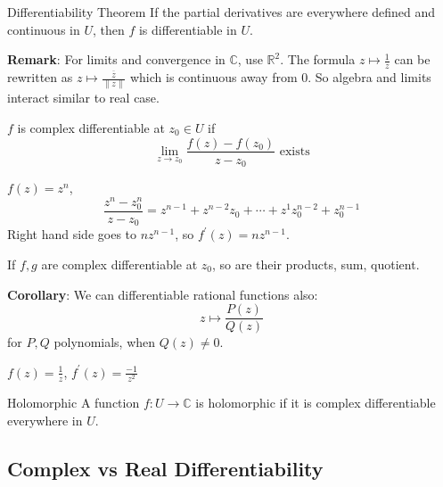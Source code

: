\documentclass{report}
\begin{document}
\begin{theorem}{Differentiability Theorem}
    If the partial derivatives are everywhere defined and continuous in $U$, then $f$ is differentiable in $U$.
\end{theorem}

\textbf{Remark}: For limits and convergence in $\mathbb{C}$, use $\mathbb{R}^{2}$. The formula $z \mapsto \frac{1}{z}$ can be rewritten as $z \mapsto \frac{\overline{z}}{\lVert z \rVert}$ which is continuous away from $0$. So algebra and limits interact similar to real case.

\begin{definition}{}
    $f$ is complex differentiable at $z_{0} \in U$ if 
        \begin{equation*}
            \lim\limits_{z \to  z_{0}} \dfrac{f(z) - f(z_{0})}{ z - z_{0}} \text{ exists}
        \end{equation*}
\end{definition}

\begin{examples}
    $f(z) = z^{n}$,
        \begin{equation*}
            \dfrac{z^{n} - z_{0}^{n}}{z - z_{0}} = z^{n - 1} + z^{n - 2}z_{0} + \cdots + z^{1}z_{0}^{n - 2} + z_{0}^{n - 1}
        \end{equation*}
    Right hand side goes to $nz^{n - 1}$, so $f^{\prime}(z) = nz^{n - 1}$.
\end{examples}

\begin{theorem}{}
    If $f, g$ are complex differentiable at $z_{0}$, so are their products, sum, quotient.
\end{theorem}

\textbf{Corollary}: We can differentiable rational functions also:
    \begin{equation*}
        z \mapsto \dfrac{P(z)}{Q(z)}
    \end{equation*}
for $P, Q$ polynomials, when $Q(z) \neq 0$.

\begin{examples}
    $f(z) = \frac{1}{z}$, $f^{\prime}(z) = \frac{-1}{z^{2}}$
\end{examples}

\begin{definition}{Holomorphic}
    A function $f: U \rightarrow \mathbb{C}$ is holomorphic if it is complex differentiable everywhere in $U$.
\end{definition}

\begin{topic}
    \section{Complex vs Real Differentiability}
\end{topic}
\end{document}
